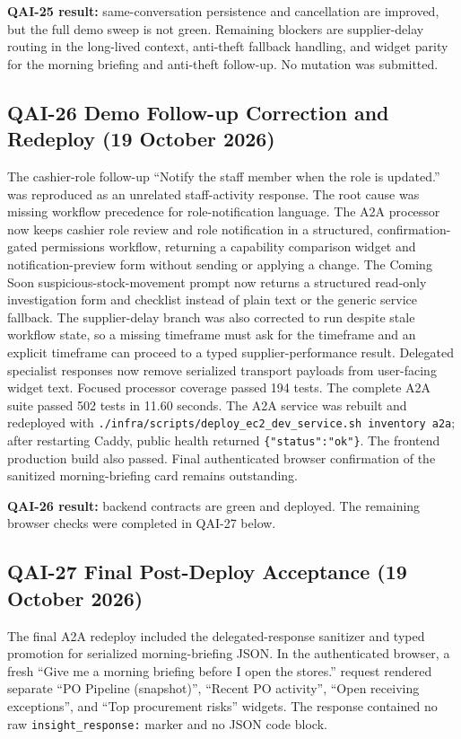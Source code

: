 \documentclass[10pt]{article}
\begin{document}
\textbf{QAI-25 result:} same-conversation persistence and cancellation are improved, but the full demo sweep is not green. Remaining blockers are supplier-delay routing in the long-lived context, anti-theft fallback handling, and widget parity for the morning briefing and anti-theft follow-up. No mutation was submitted.

\subsection{QAI-26 Demo Follow-up Correction and Redeploy (19 October 2026)}
The cashier-role follow-up ``Notify the staff member when the role is updated.'' was reproduced as an unrelated staff-activity response. The root cause was missing workflow precedence for role-notification language. The A2A processor now keeps cashier role review and role notification in a structured, confirmation-gated permissions workflow, returning a capability comparison widget and notification-preview form without sending or applying a change. The Coming Soon suspicious-stock-movement prompt now returns a structured read-only investigation form and checklist instead of plain text or the generic service fallback. The supplier-delay branch was also corrected to run despite stale workflow state, so a missing timeframe must ask for the timeframe and an explicit timeframe can proceed to a typed supplier-performance result. Delegated specialist responses now remove serialized transport payloads from user-facing widget text. Focused processor coverage passed 194 tests. The complete A2A suite passed 502 tests in 11.60 seconds. The A2A service was rebuilt and redeployed with \texttt{./infra/scripts/deploy\_ec2\_dev\_service.sh inventory a2a}; after restarting Caddy, public health returned \texttt{\{"status":"ok"\}}. The frontend production build also passed. Final authenticated browser confirmation of the sanitized morning-briefing card remains outstanding.

\textbf{QAI-26 result:} backend contracts are green and deployed. The remaining browser checks were completed in QAI-27 below.

\subsection{QAI-27 Final Post-Deploy Acceptance (19 October 2026)}
The final A2A redeploy included the delegated-response sanitizer and typed promotion for serialized morning-briefing JSON. In the authenticated browser, a fresh ``Give me a morning briefing before I open the stores.'' request rendered separate ``PO Pipeline (snapshot)'', ``Recent PO activity'', ``Open receiving exceptions'', and ``Top procurement risks'' widgets. The response contained no raw \texttt{insight\_response:} marker and no JSON code block.
\end{document}
